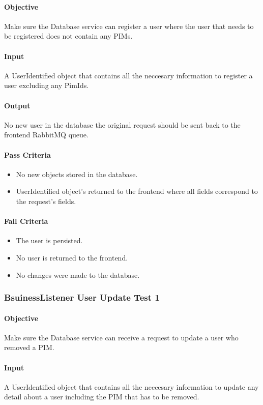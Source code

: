 \documentclass[hidelinks,english]{article}
\begin{document}
				\paragraph{Objective} Make sure the Database service can register a user where the user that needs to be registered does not contain any PIMs.
				\paragraph{Input} A UserIdentified object that contains all the neccesary information to register a user excluding any PimIds.
				\paragraph{Output} No new user in the database the original request should be sent back to the frontend RabbitMQ queue.
				\paragraph{Pass Criteria}
				\begin{itemize}
					\item No new objects stored in the database.
					\item UserIdentified object's returned to the frontend where all fields correspond to the request's fields.
				\end{itemize}
				\paragraph{Fail Criteria}
				\begin{itemize}
					\item The user is persisted.
					\item No user is returned to the frontend.
					\item No changes were made to the database.
				\end{itemize}
				
				\subsubsection{BsuinessListener User Update Test 1}\label{databasebusinesslistenerupdatetest1}
				\paragraph{Objective} Make sure the Database service can receive a request to update a user who removed a PIM.
				\paragraph{Input} A UserIdentified object that contains all the neccesary information to update any detail about a user including the PIM that has to be removed.
\end{document}
